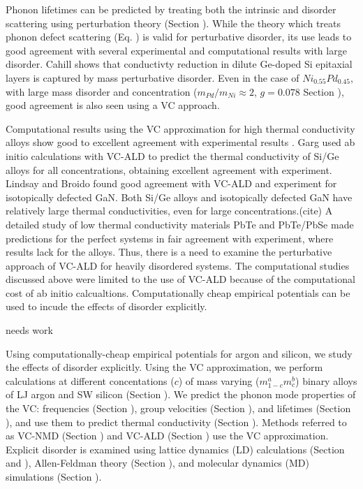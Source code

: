 \documentclass[aps,prb,twocolumn,superscriptaddress,amsmath,amssymb,floatfix]{revtex4}
\begin{document}
Phonon lifetimes can be predicted by treating both the intrinsic 
and disorder scattering using perturbation theory (Section ). 
While the theory which treats phonon defect scattering (Eq. ) 
is valid for
perturbative disorder, its use leads to good agreement with
several experimental and computational results with large disorder.  
Cahill shows that conductivty reduction in dilute 
Ge-doped Si epitaxial layers 
is captured by mass perturbative disorder.
\cite{cahill_thermal_2004,cahill_thermal_2005} 
Even in the
case of $Ni_{0.55}Pd_{0.45}$, with large mass disorder and 
concentration ($m_{Pd}/m_{Ni} \approx 2$, $g=0.078$ Section ), 
good agreement is also seen using a VC approach.
\cite{kamitakahara_vibrations_1974}

Computational results using the VC approximation 
for high thermal conductivity 
alloys show good to excellent agreement with experimental results
\cite{garg_role_2011,lindsay_thermal_2012}.
Garg used ab initio calculations with VC-ALD   
to predict the thermal conductivity of Si/Ge alloys 
for all concentrations, obtaining excellent agreement with experiment.
\cite{garg_role_2011}  Lindsay and Broido 
found good agreement with VC-ALD and experiment for 
isotopically defected GaN.\cite{lindsay_thermal_2012}  
Both Si/Ge alloys and isotopically defected GaN have relatively large 
thermal conductivities, even for large concentrations.(cite) 
A detailed study of low thermal conductivity materials 
PbTe\cite{shiga_microscopic_2012} and PbTe/PbSe\cite{tian_phonon_2012} 
made predictions for the perfect systems in fair agreement with 
experiment, where results lack for the alloys. 
Thus, there is a need to examine the perturbative approach of 
VC-ALD for heavily disordered systems. 
The computational studies discussed above were limited to the use 
of VC-ALD because of the computational cost of ab initio calcualtions. 
Computationally cheap empirical potentials can be used to incude 
the effects of disorder explicitly.

needs work 

Using computationally-cheap empirical potentials for argon 
and silicon\cite{stillinger_computer_1985},  
we study the effects of disorder explicitly. 
Using the VC approximation, 
we perform calculations at different concentations ($c$) 
of mass varying ($m^a_{1-c}m^b_{c}$) binary alloys of LJ argon 
and SW silicon (Section ). We predict 
the phonon mode properties of the VC:  
frequencies (Section ), group velocities (Section ),  
and lifetimes (Section ), and use them to predict thermal
conductivity (Section ). Methods referred to as VC-NMD (Section )
and VC-ALD (Section ) use the VC approximation. Explicit disorder 
is examined using lattice dynamics (LD) calculations 
(Section and ), Allen-Feldman theory (Section ),\cite{allen_thermal_1993} 
and molecular dynamics (MD) simulations 
(Section ). 
\end{document}
